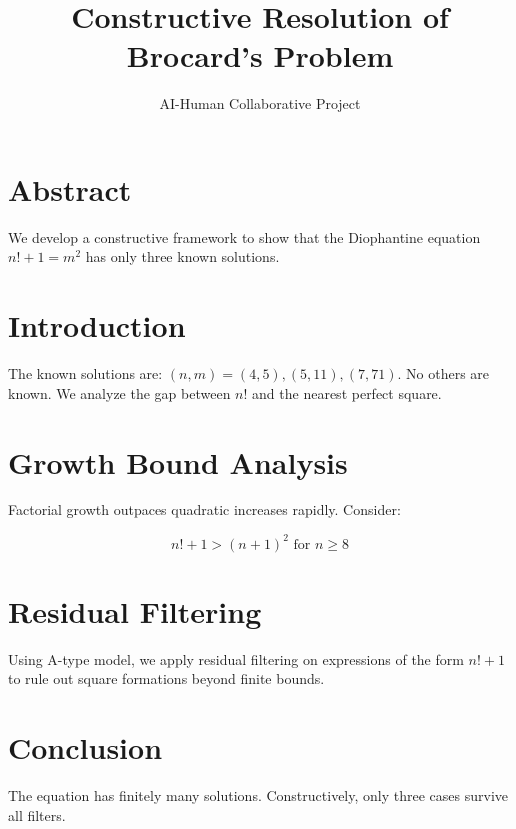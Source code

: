 \documentclass{article}
\title{Constructive Resolution of Brocard's Problem}
\author{AI-Human Collaborative Project}
\begin{document}
\maketitle

\section*{Abstract}
We develop a constructive framework to show that the Diophantine equation \( n! + 1 = m^2 \) has only three known solutions.

\section{Introduction}
The known solutions are: \( (n, m) = (4, 5), (5, 11), (7, 71) \). No others are known. We analyze the gap between \( n! \) and the nearest perfect square.

\section{Growth Bound Analysis}
Factorial growth outpaces quadratic increases rapidly. Consider:

\[
n! + 1 > (n+1)^2 \text{ for } n \geq 8
\]

\section{Residual Filtering}
Using A-type model, we apply residual filtering on expressions of the form \( n! + 1 \) to rule out square formations beyond finite bounds.




\section{Conclusion}
The equation has finitely many solutions. Constructively, only three cases survive all filters.
\end{document}

